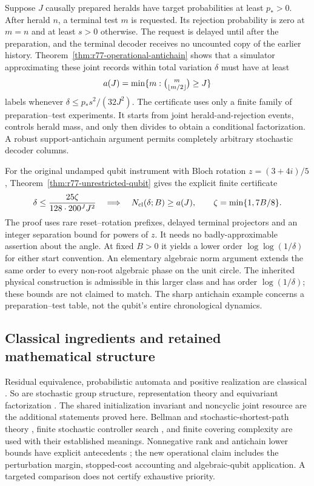 Suppose $J$ causally prepared heralds have target probabilities at
least $p_*>0$.  After herald $n$, a terminal test $m$ is requested.
Its rejection probability is zero at $m=n$ and at least $s>0$ otherwise.
The request is delayed until after the preparation, and the terminal
decoder receives no uncounted copy of the earlier history.
Theorem~\ref{thm:r77-operational-antichain} shows that a simulator
approximating these joint records within total variation $\delta$
must have at least
\[
 a(J)=\min\{m:\tbinom m{\lfloor m/2\rfloor}\ge J\}
\]
labels whenever $\delta\le p_*s^2/(32J^2)$.  The certificate uses only
a finite family of preparation--test experiments.  It starts from joint
herald-and-rejection events, controls herald mass, and only then divides
to obtain a conditional factorization.  A robust support-antichain
argument permits completely arbitrary stochastic decoder columns.

For the original undamped qubit instrument with Bloch rotation
$z=(3+4i)/5$, Theorem~\ref{thm:r77-unrestricted-qubit} gives the
explicit finite certificate
\begin{equation}\label{eq:r77-intro-arithmetic}
 \delta\le\frac{25\zeta}{128\cdot200^J J^2}
 \quad\Longrightarrow\quad N_{\rm cl}(\delta;B)\ge a(J),
 \qquad\zeta=\min\{1,7B/8\}.
\end{equation}
The proof uses rare reset--rotation prefixes, delayed terminal
projectors and an integer separation bound for powers of $z$.
It needs no badly-approximable assertion about the angle.  At fixed
$B>0$ it yields a lower order $\log\log(1/\delta)$ for either start
convention.  An elementary algebraic norm argument extends the same
order to every non-root algebraic phase on the unit circle.
The inherited physical construction is admissible in this larger class
and has order $\log(1/\delta)$; these bounds are not claimed to match.
The sharp antichain example concerns a preparation--test table, not
the qubit's entire chronological dynamics.

\subsection*{Classical ingredients and retained mathematical structure}

Residual equivalence, probabilistic automata and positive realization
are classical \cite{RabinScott59,Rabin63,Heller65,CarlylePaz71,BenvenutiFarina04}.
So are stochastic group structure, representation theory and equivariant
factorization \cite{Schwarz64,Flor69,Serre77,GPT13}.  The shared
initialization invariant and noncyclic joint resource are the additional
statements proved here.  Bellman and stochastic-shortest-path theory
\cite{BertsekasTsitsiklis91}, finite stochastic controller search
\cite{Meuleau99,PoupartBoutilier03}, and finite covering complexity
\cite{Karp72} are used with their established meanings.  Nonnegative
rank and antichain lower bounds have explicit antecedents
\cite{GPT13,VandaeleGillisGlineur17}; the new operational claim includes
the perturbation margin, stopped-cost accounting and algebraic-qubit
application.  A targeted comparison does not certify exhaustive priority.

